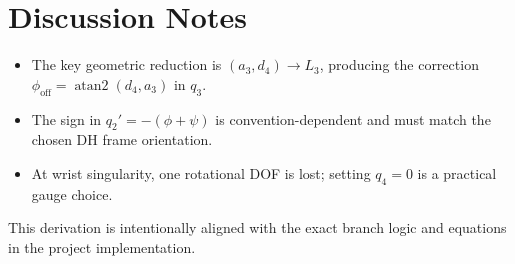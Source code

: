 \documentclass[11pt]{article}
\begin{document}
\section{Discussion Notes}
\begin{itemize}[leftmargin=1.5em]
    \item The key geometric reduction is $(a_3,d_4)\rightarrow L_3$, producing the correction $\phi_{\mathrm{off}}=\operatorname{atan2}(d_4,a_3)$ in $q_3$.
    \item The sign in $q_2'=-(\phi+\psi)$ is convention-dependent and must match the chosen DH frame orientation.
    \item At wrist singularity, one rotational DOF is lost; setting $q_4=0$ is a practical gauge choice.
\end{itemize}

\vspace{0.5em}
\noindent
This derivation is intentionally aligned with the exact branch logic and equations in the project implementation.
\end{document}
